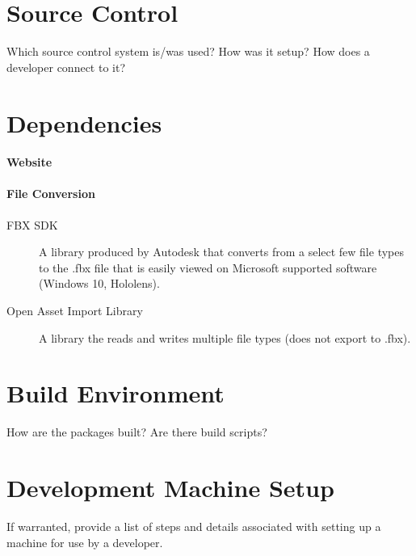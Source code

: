 \section{Source  Control}
Which source control system is/was used?  How was it setup?  How does a developer 
connect to it? 

\section{Dependencies}
\paragraph{Website}

\paragraph{File Conversion}
\begin{description}
    \item [FBX SDK] A library produced by Autodesk that converts from a select few file types to the .fbx file that is easily viewed on Microsoft supported software (Windows 10, Hololens).
    \item [Open Asset Import Library] A library the reads and writes multiple file types (does not export to .fbx).
\end{description}

\section{Build  Environment}
How are the packages built?  Are there build scripts? 

\section{Development Machine Setup}
If warranted, provide a list of steps and details associated with setting up a 
machine for use by a developer. 


